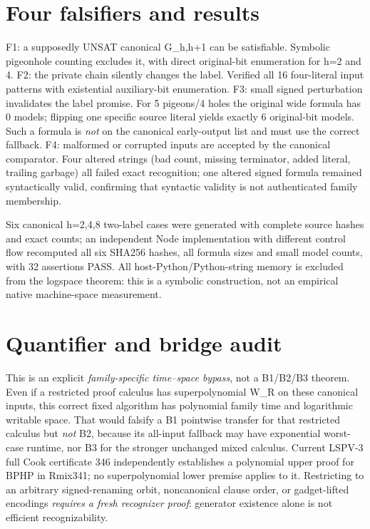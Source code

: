 \documentclass[11pt]{article}
\begin{document}
\section*{Four falsifiers and results}
F1: a supposedly UNSAT canonical G_{h,h+1} can be satisfiable. Symbolic pigeonhole counting excludes it, with direct original-bit enumeration for h=2 and 4. F2: the private chain silently changes the label. Verified all 16 four-literal input patterns with existential auxiliary-bit enumeration. F3: small signed perturbation invalidates the label promise. For 5 pigeons/4 holes the original wide formula has 0 models; flipping one specific source literal yields exactly 6 original-bit models. Such a formula is \emph{not} on the canonical early-output list and must use the correct fallback. F4: malformed or corrupted inputs are accepted by the canonical comparator. Four altered strings (bad count, missing terminator, added literal, trailing garbage) all failed exact recognition; one altered signed formula remained syntactically valid, confirming that syntactic validity is not authenticated family membership.

Six canonical h=2,4,8 two-label cases were generated with complete source hashes and exact counts; an independent Node implementation with different control flow recomputed all six SHA256 hashes, all formula sizes and small model counts, with 32 assertions PASS. All host-Python/Python-string memory is excluded from the logspace theorem: this is a symbolic construction, not an empirical native machine-space measurement.

\section*{Quantifier and bridge audit}
This is an explicit \emph{family-specific time--space bypass}, not a B1/B2/B3 theorem. Even if a restricted proof calculus has superpolynomial W_R on these canonical inputs, this correct fixed algorithm has polynomial family time and logarithmic writable space. That would falsify a B1 pointwise transfer for that restricted calculus but \emph{not} B2, because its all-input fallback may have exponential worst-case runtime, nor B3 for the stronger unchanged mixed calculus. Current LSPV-3 full Cook certificate 346 independently establishes a polynomial upper proof for BPHP in Rmix341; no superpolynomial lower premise applies to it. Restricting to an arbitrary signed-renaming orbit, noncanonical clause order, or gadget-lifted encodings \emph{requires a fresh recognizer proof}: generator existence alone is not efficient recognizability.
\end{document}
